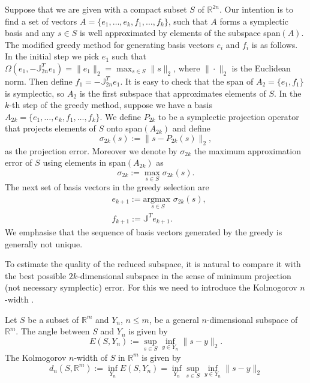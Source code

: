 Suppose that we are given with a compact subset $S$ of $\mathbb R^{2n}$. Our intention is to find a set of vectors $A=\{e_1,\dots,e_k,f_1,\dots,f_k\}$, such that $A$ forms a symplectic basis and any $s\in S$ is well approximated by elements of the subspace span$(A)$. The modified greedy method for generating basis vectors $e_i$ and $f_i$ is as follows. In the initial step we pick $e_1$ such that $\Omega(e_1,-\mathbb{J}_{2n}^T e_1) = \|e_1\|_2 = \max_{s\in S} \|s\|_2$, where $\|\cdot\|_2$ is the Euclidean norm. Then define $f_1 = -\mathbb{J}_{2n}^T e_1$. It is easy to check that the span of $A_2 = \{e_1,f_1\}$ is symplectic, so $A_2$ is the first subspace that approximates elements of $S$. In the $k$-th step of the greedy method, suppose we have a basis $A_{2k} = \{ e_1,\dots, e_k , f_1,\dots ,f_k \}$. We define $P_{2k}$ to be a symplectic projection operator that projects elements of $S$ onto span$(A_{2k})$ and define
\begin{equation} \label{eq:new1}
	\sigma_{2k}(s) := \|s-P_{2k}(s)\|_2,
\end{equation}
as the projection error. Moreover we denote by $\sigma_{2k}$ the maximum approximation error of $S$ using elements in span$(A_{2k})$ as
\begin{equation} \label{eq:new2}
	\sigma_{2k} := \max_{s\in S} \sigma_{2k}(s).
\end{equation}
The next set of basis vectors in the greedy selection are
\begin{equation} \label{eq:new3}
\begin{aligned}
	& e_{k+1} := \underset{s\in S}{\text{argmax }}\sigma_{2k}(s), \\
	& f_{k+1} := \mathbb{J}^T e_{k+1}.
\end{aligned}
\end{equation}
We emphasise that the sequence of basis vectors generated by the greedy is generally not unique. 

To estimate the quality of the reduced subspace, it is natural to compare it with the best possible $2k$-dimensional subspace in the sense of minimum projection (not necessary symplectic) error. For this we need to introduce the Kolmogorov $n$-width \cite{Kolmogoroff:1936fj,Pinkus:1985vy}.

\begin{definition}
Let $S$ be a subset of $\mathbb R^{m}$ and $Y_n$, $n\leq m$, be a general $n$-dimensional subspace of $\mathbb R^{m}$. The angle between $S$ and $Y_n$ is given by
\begin{equation} \label{eq:new4}
	E(S,Y_n) := \sup_{s\in S} \inf_{y\in Y_n} \|s-y\|_2.
\end{equation}
The Kolmogorov $n$-width of $S$ in $\mathbb R^m$ is given by
\begin{equation} \label{eq:new5}
	d_{n}(S,\mathbb{R}^m) := \inf_{Y_n} E(S,Y_n) = \inf_{Y_n} \sup_{s\in S} \inf_{y\in Y_n} \|s-y\|_2
\end{equation}
\end{definition}

